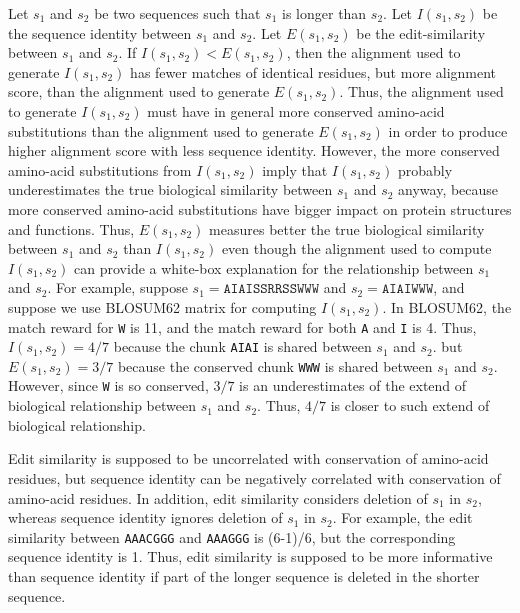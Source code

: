 \documentclass[11pt,letterpaper]{llncs2e/llncs}
\begin{document}
Let \(s_1\) and \(s_2\) be two sequences such that \(s_1\) is longer than \(s_2\).
Let \(I(s_1, s_2)\) be the sequence identity between \(s_1\) and \(s_2\).
Let \(E(s_1, s_2)\) be the edit-similarity between \(s_1\) and \(s_2\).
If \(I(s_1, s_2) < E(s_1, s_2)\), then the alignment used to generate \(I(s_1, s_2)\) has fewer matches of identical residues, but more alignment score, than the alignment used to generate \(E(s_1, s_2)\).
Thus, the alignment used to generate \(I(s_1, s_2)\) must have in general more conserved amino-acid substitutions than the alignment used to generate \(E(s_1, s_2)\) in order to produce higher alignment score with less sequence identity.
However, the more conserved amino-acid substitutions from \(I(s_1, s_2)\) imply that \(I(s_1, s_2)\) probably underestimates the true biological similarity between \(s_1\) and \(s_2\) anyway, because more conserved amino-acid substitutions have bigger impact on protein structures and functions.
Thus, \(E(s_1, s_2)\) measures better the true biological similarity between \(s_1\) and \(s_2\) than \(I(s_1, s_2)\) even though the alignment used to compute \(I(s_1, s_2)\) can provide a white-box explanation for the relationship between \(s_1\) and \(s_2\).
For example, suppose \(s_1 = \texttt{AIAISSRRSSWWW}\) and \(s_2 = \texttt{AIAIWWW}\), 
and suppose we use BLOSUM62 matrix for computing \(I(s_1, s_2)\).
In BLOSUM62, the match reward for \texttt{W} is 11, and the match reward for both \texttt{A} and \texttt{I} is 4.
Thus, \(I(s_1, s_2) = 4/7\) because the           chunk \texttt{AIAI} is shared between \(s_1\) and \(s_2\).
but \(E(s_1, s_2) = 3/7\) because the conserved chunk \texttt{WWW}  is shared between \(s_1\) and \(s_2\).
However, since \texttt{W} is so conserved, \(3/7\) is an underestimates of the extend of biological relationship between \(s_1\) and \(s_2\).
Thus, \(4/7\) is closer to such extend of biological relationship.

Edit similarity is supposed to be uncorrelated with conservation of amino-acid residues, but sequence identity can be negatively correlated with conservation of amino-acid residues.
In addition, edit similarity considers deletion of \(s_1\) in \(s_2\), whereas sequence identity ignores deletion of \(s_1\) in \(s_2\).
For example, the edit similarity between \texttt{AAACGGG} and \texttt{AAAGGG} is (6-1)/6, but the corresponding sequence identity is 1. Thus, edit similarity is supposed to be more informative than sequence identity if part of the longer sequence is deleted in the shorter sequence.

\fi
\end{document}
